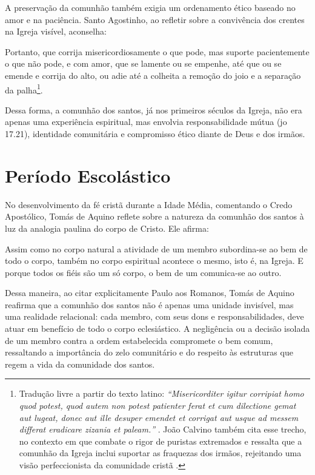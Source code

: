 A preservação da comunhão também exigia um ordenamento ético baseado no amor e na paciência. Santo Agostinho, ao refletir sobre a convivência dos crentes na Igreja visível, aconselha:

\begin{citacao}
Portanto, que corrija misericordiosamente o que pode, mas suporte pacientemente o que não pode, e com amor, que se lamente ou se empenhe, até que ou se emende e corrija do alto, ou adie até a colheita a remoção do joio e a separação da palha\footnote{Tradução livre a partir do texto latino: \textit{``\foreignlanguage{latin}{Misericorditer igitur corripiat homo quod potest, quod autem non potest patienter ferat et cum dilectione gemat aut lugeat, donec aut ille desuper emendet et corrigat aut usque ad messem differat eradicare zizania et paleam.}''} \cite[livro III, capítulo 1, seção 15]{agostinhoContraParmeniani}. João Calvino também cita esse trecho, no contexto em que combate o rigor de puristas extremados e ressalta que a comunhão da Igreja inclui suportar as fraquezas dos irmãos, rejeitando uma visão perfeccionista da comunidade cristã \cite[v. 4, cap. 1, seção 16, p. 1887]{calvino2022}.}.
\end{citacao}

Dessa forma, a comunhão dos santos, já nos primeiros séculos da Igreja, não era apenas uma experiência espiritual, mas envolvia responsabilidade mútua (\gls{jo} 17.21), identidade comunitária e compromisso ético diante de Deus e dos irmãos.

\section{Período Escolástico}

No desenvolvimento da fé cristã durante a Idade Média, comentando o Credo Apostólico, Tomás de Aquino reflete sobre a natureza da comunhão dos santos à luz da analogia paulina do corpo de Cristo. Ele afirma:
\begin{citacao}
Assim como no corpo natural a atividade de um membro subordina-se ao bem de todo o corpo, também no corpo espiritual acontece o mesmo, isto é, na Igreja. E porque todos os fiéis são um só corpo, o bem de um comunica-se ao outro. \cite[p. 79]{aquinoCredo2004}
\end{citacao}

Dessa maneira, ao citar explicitamente Paulo aos Romanos, Tomás de Aquino reafirma que a comunhão dos santos não é apenas uma unidade invisível, mas uma realidade relacional: cada membro, com seus dons e responsabilidades, deve atuar em benefício de todo o corpo eclesiástico. A negligência ou a decisão isolada de um membro contra a ordem estabelecida compromete o bem comum, ressaltando a importância do zelo comunitário e do respeito às estruturas que regem a vida da comunidade dos santos.

